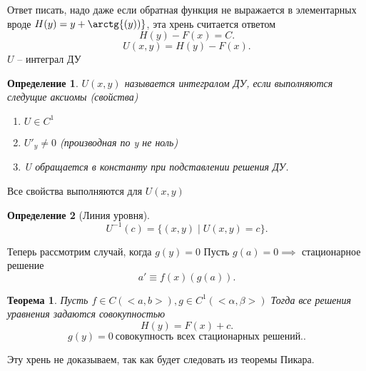 \documentclass[14pt]{extarticle}
\newtheorem{theorem}{Теорема}
\newtheorem{definition}{Определение}
\begin{document}
Ответ писать, надо даже если обратная функция не выражается в элементарных вроде $H(y) = y + \arctg{(y))}$, эта хрень считается ответом
\[
	H(y) - F(x) = C
	.\]
\[
	U(x,y) = H(y) - F(x)
	.\]
$U$ -- интеграл ДУ
\begin{definition}
	$U(x,y)$ называется интегралом ДУ, если выполняются следущие аксиомы (свойства)
	\begin{enumerate}
		\item $U \in C^{1}$
		\item $U'_{y} \neq 0$ (производная по y не ноль)
		\item U обращается в константу при подставлении решения ДУ.
	\end{enumerate}
\end{definition}
Все свойства выполняются для $U(x,y)$
\begin{definition}[Линия уровня]
	\[
		U^{-1}(c) = \{(x,y) \mid U(x,y) = c\}
		.\]
\end{definition}
Теперь рассмотрим случай, когда $g(y) = 0$
Пусть  $g(a) = 0 \implies$ стационарное решение
\[
	a' \equiv f(x)(g(a))
	.\]
\begin{theorem}
	Пусть $f \in C(<a,b>), g \in C^{1}(<\alpha,\beta>)$
	Тогда все решения уравнения задаются совокупностью
	\[
		H(y) = F(x) + c
		.\]
	\[
		g(y) = 0 ~\text{совокупность всех стационарных решений.}
		.\]
\end{theorem}
Эту хрень не доказываем, так как будет следовать из теоремы Пикара.
\end{document}
